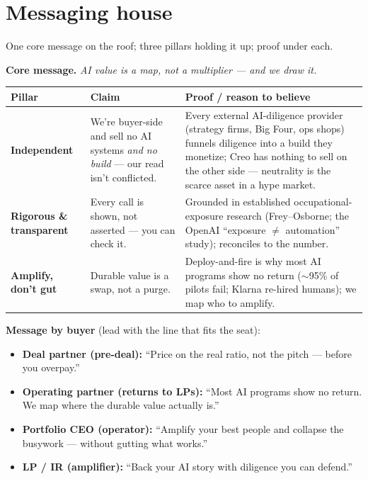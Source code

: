 \documentclass[11pt]{article}
\begin{document}
\section{Messaging house}
One core message on the roof; three pillars holding it up; proof under each.

\begin{callout}
\textbf{Core message.} \emph{AI value is a map, not a multiplier --- and we draw it.}
\end{callout}

\begin{center}
\renewcommand{\arraystretch}{1.3}\small
\begin{tabular}{p{2.7cm} p{4.5cm} p{5.0cm}}
\toprule
\textbf{Pillar} & \textbf{Claim} & \textbf{Proof / reason to believe} \\
\midrule
\textbf{Independent} & We're buyer-side and sell no AI systems \emph{and no build} --- our read isn't conflicted. & Every external AI-diligence provider (strategy firms, Big Four, ops shops) funnels diligence into a build they monetize; Creo has nothing to sell on the other side --- neutrality is the scarce asset in a hype market. \\
\textbf{Rigorous \& transparent} & Every call is shown, not asserted --- you can check it. & Grounded in established occupational-exposure research (Frey--Osborne; the OpenAI ``exposure $\neq$ automation'' study); reconciles to the number. \\
\textbf{Amplify, don't gut} & Durable value is a swap, not a purge. & Deploy-and-fire is why most AI programs show no return ($\sim$95\% of pilots fail; Klarna re-hired humans); we map who to amplify. \\
\bottomrule
\end{tabular}
\end{center}

\textbf{Message by buyer} (lead with the line that fits the seat):
\begin{itemize}
  \item \textbf{Deal partner (pre-deal):} ``Price on the real ratio, not the pitch --- before you overpay.''
  \item \textbf{Operating partner (returns to LPs):} ``Most AI programs show no return. We map where the durable value actually is.''
  \item \textbf{Portfolio CEO (operator):} ``Amplify your best people and collapse the busywork --- without gutting what works.''
  \item \textbf{LP / IR (amplifier):} ``Back your AI story with diligence you can defend.''
\end{itemize}
\end{document}
